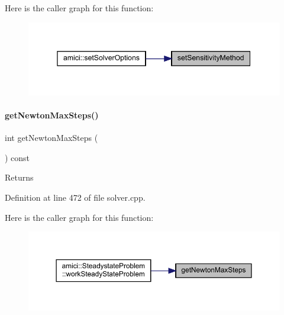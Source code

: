 Here is the caller graph for this function\+:
\nopagebreak
\begin{figure}[H]
\begin{center}
\leavevmode
\includegraphics[width=345pt]{classamici_1_1_solver_a3a7713f2ce77ffade77445a825ad289d_icgraph}
\end{center}
\end{figure}
\mbox{\label{classamici_1_1_solver_ad68589cfe3af35633ff5fa1a4e7aaddb}} 
\paragraph{\texorpdfstring{getNewtonMaxSteps()}{getNewtonMaxSteps()}}
{\footnotesize\ttfamily int get\+Newton\+Max\+Steps (\begin{DoxyParamCaption}{ }\end{DoxyParamCaption}) const}

\begin{DoxyReturn}{Returns}

\end{DoxyReturn}


Definition at line 472 of file solver.\+cpp.

Here is the caller graph for this function\+:
\nopagebreak
\begin{figure}[H]
\begin{center}
\leavevmode
\includegraphics[width=350pt]{classamici_1_1_solver_ad68589cfe3af35633ff5fa1a4e7aaddb_icgraph}
\end{center}
\end{figure}
\mbox{\label{classamici_1_1_solver_abf2e868e186c724c8ab939ba261ef314}} 
